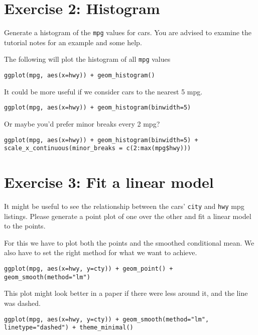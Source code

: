 \documentclass{tufte-handout}
\begin{document}
\section*{Exercise 2: Histogram}
Generate a histogram of the \lstinline{mpg} values for cars.  You are advised to examine the tutorial notes for an example and some help.

\ifanswers
The following will plot the histogram of all \lstinline{mpg} values
\begin{lstlisting}
ggplot(mpg, aes(x=hwy)) + geom_histogram()
\end{lstlisting}

It could be more useful if we consider cars to the nearest 5 mpg.
\begin{lstlisting}
ggplot(mpg, aes(x=hwy)) + geom_histogram(binwidth=5)
\end{lstlisting}

Or maybe you'd prefer minor breaks every 2 mpg?
\begin{lstlisting}
ggplot(mpg, aes(x=hwy)) + geom_histogram(binwidth=5) + scale_x_continuous(minor_breaks = c(2:max(mpg$hwy)))
\end{lstlisting}
\fi

\section*{Exercise 3: Fit a linear model}

It might be useful to see the relationship between the cars' \lstinline{city} and \lstinline{hwy} mpg listings.  Please generate a point plot of one over the other and fit a linear model to the points.

\ifanswers
For this we have to plot both the points and the smoothed conditional mean.  We also have to set the right method for what we want to achieve.
\begin{lstlisting}
ggplot(mpg, aes(x=hwy, y=cty)) + geom_point() + geom_smooth(method="lm")
\end{lstlisting}

This plot might look better in a paper if there were less around it, and the line was dashed.
\begin{lstlisting}
ggplot(mpg, aes(x=hwy, y=cty)) + geom_smooth(method="lm", linetype="dashed") + theme_minimal()
\end{lstlisting}
\fi



\end{document}
